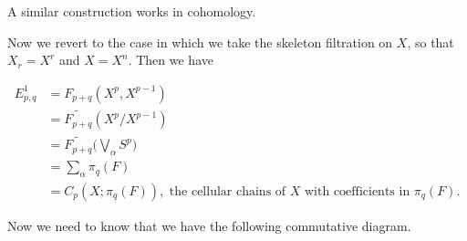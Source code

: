 \documentclass[../main]{subfiles}
\begin{document}
A similar construction works in cohomology.

Now we revert to the case in which we take the skeleton filtration on $X$, so that $X_r=X^r$ and $X=X^n$. Then we have

\begin{align*}
    E_{p,q}^1&=F_{p+q}(X^p,X^{p-1})\\
    &=\widetilde{F_{p+q}}(X^p/X^{p-1})\\
    &=\widetilde{F_{p+q}}\bigg(\bigvee_\alpha S^p\bigg)\\
    &=\sum_{\alpha}\pi_q(F)\\
    &=C_p(X;\pi_q(F)),\text{ the cellular chains of }X\text{ with coefficients in }\pi_q(F).
\end{align*}

Now we need to know that we have the following commutative diagram. 

\begin{center}
\end{center}
\end{document}
